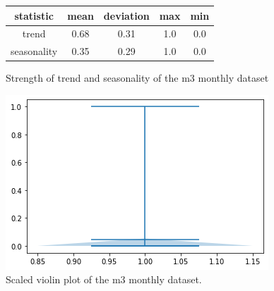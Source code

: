 \begin{figure}[htb]
  \centering
  \begin{center}
    \begin{tabular}{||c | c | c | c | c |}
      \hline
      statistic   & mean & deviation & max & min \\
      \hline
      trend       & 0.68 & 0.31      & 1.0 & 0.0 \\
      \hline
      seasonality & 0.35 & 0.29      & 1.0 & 0.0 \\
      \hline
      \hline
    \end{tabular}
    \caption{Strength of trend and seasonality of the m3 monthly dataset}
  \end{center}
  \endminipage\hfill
  \includegraphics[width=\linewidth]{./img/m3_monthly_violin.png}
  \caption{Scaled violin plot of the m3 monthly dataset.}
  \label{fig:m3_monthly_violin}
  \endminipage\hfill
\end{figure}

\clearpage
